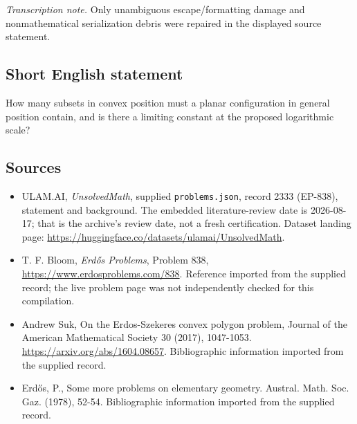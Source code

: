 \documentclass[11pt,a4paper]{article}
\begin{document}
{\small\emph{Transcription note.} Only unambiguous escape/formatting damage and nonmathematical serialization debris were repaired in the displayed source statement.}

\subsection{Short English statement}

How many subsets in convex position must a planar configuration in general position contain, and is there a limiting constant at the proposed logarithmic scale?

\subsection{Sources}

{\small

\begin{itemize}

\item[\hypertarget{source:2333:1}{S1}] ULAM.AI, \emph{UnsolvedMath}, supplied \texttt{problems.json}, record 2333 (EP-838), statement and background. The embedded literature-review date is 2026-08-17; that is the archive’s review date, not a fresh certification. Dataset landing page: \url{https://huggingface.co/datasets/ulamai/UnsolvedMath}.

\item[\hypertarget{source:2333:2}{S2}] T. F. Bloom, \emph{Erdős Problems}, Problem 838, \url{https://www.erdosproblems.com/838}. Reference imported from the supplied record; the live problem page was not independently checked for this compilation.

\item[\hypertarget{source:2333:3}{S3}] Andrew Suk, On the Erdos-Szekeres convex polygon problem, Journal of the American Mathematical Society 30 (2017), 1047-1053. \url{https://arxiv.org/abs/1604.08657}. Bibliographic information imported from the supplied record.

\item[\hypertarget{source:2333:4}{S4}] Erd\H{o}s, P., Some more problems on elementary geometry. Austral. Math. Soc. Gaz. (1978), 52-54. Bibliographic information imported from the supplied record.

\end{itemize}

}

\label{end:2333}
\end{document}
